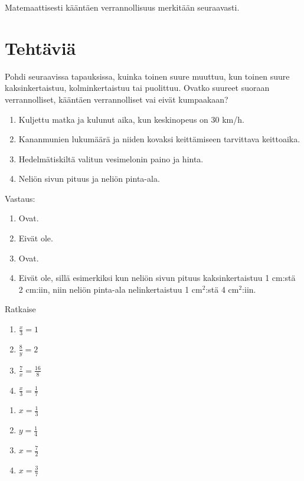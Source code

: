 Matemaattisesti kääntäen verrannollisuus merkitään seuraavasti.


\section*{Tehtäviä}

\begin{tehtava}
    Pohdi seuraavissa tapauksissa, kuinka toinen suure muuttuu, kun toinen suure
    kaksinkertaistuu, kolminkertaistuu tai puolittuu. Ovatko suureet
    suoraan verrannolliset, kääntäen verrannolliset vai eivät kumpaakaan?
    
    \begin{enumerate}
        \item Kuljettu matka ja kulunut aika, kun keskinopeus on 30 km/h.
        \item Kananmunien lukumäärä ja niiden kovaksi keittämiseen tarvittava keittoaika.
        \item Hedelmätiskiltä valitun vesimelonin paino ja hinta.
        \item Neliön sivun pituus ja neliön pinta-ala.
    \end{enumerate}
    
    \begin{vastaus}
        Vastaus:
        \begin{enumerate}
            \item Ovat.
            \item Eivät ole.
            \item Ovat.
            \item Eivät ole, sillä esimerkiksi kun neliön sivun pituus
                kaksinkertaistuu 1 cm:stä 2 cm:iin, niin neliön pinta-ala
                nelinkertaistuu 1 cm$^2$:stä 4 cm$^2$:iin.
        \end{enumerate}
    \end{vastaus}
\end{tehtava}

\begin{tehtava}
Ratkaise
\begin{enumerate}
\item $ \frac{x}{3} = 1$
\item $ \frac{8}{y} = 2$
\item $ \frac{7}{x} = \frac{16}{8}$
\item $ \frac{x}{3} = \frac{1}{7}$
\end{enumerate}
\begin{vastaus}
\begin{enumerate}
\item $x= \frac{1}{3}$
\item $y= \frac{1}{4}$
\item $x= \frac{7}{2}$
\item $x= \frac{3}{7}$
\end{enumerate}
\end{vastaus}
\end{tehtava}

